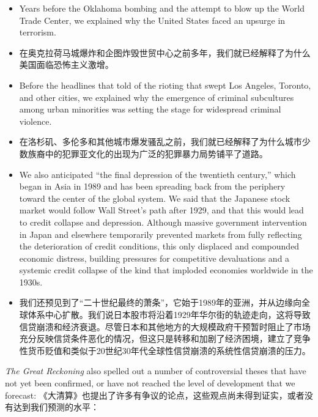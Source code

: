 \begin{itemize}
\item Years before the Oklahoma bombing and the attempt to blow up the World Trade Center, we explained why the United States faced an upsurge in terrorism. 
\item \small 在奥克拉荷马城爆炸和企图炸毁世贸中心之前多年，我们就已经解释了为什么美国面临恐怖主义激增。
\end{itemize}


\begin{itemize}
\item Before the headlines that told of the rioting that swept Los Angeles, Toronto, and other cities, we explained why the emergence of criminal subcultures among urban minorities was setting the stage for widespread criminal violence. 
\item \small 在洛杉矶、多伦多和其他城市爆发骚乱之前，我们就已经解释了为什么城市少数族裔中的犯罪亚文化的出现为广泛的犯罪暴力局势铺平了道路。
\end{itemize}


\begin{itemize}
\item We also anticipated “the final depression of the twentieth century,” which began in Asia in 1989 and has been spreading back from the periphery toward the center of the global system. We said that the Japanese stock market would follow Wall Street's path after 1929, and that this would lead to credit collapse and depression. Although massive government intervention in Japan and elsewhere temporarily prevented markets from fully reflecting the deterioration of credit conditions, this only displaced and compounded economic distress, building pressures for competitive devaluations and a systemic credit collapse of the kind that imploded economies worldwide in the 1930s. 
\item \small 我们还预见到了“二十世纪最终的萧条”，它始于1989年的亚洲，并从边缘向全球体系中心扩散。我们说日本股市将沿着1929年华尔街的轨迹走向，这将导致信贷崩溃和经济衰退。尽管日本和其他地方的大规模政府干预暂时阻止了市场充分反映信贷条件恶化的情况，但这只是转移和加剧了经济困境，建立了竞争性货币贬值和类似于20世纪30年代全球性信贷崩溃的系统性信贷崩溃的压力。
\end{itemize}


\begin{Parallel}{97mm}{45mm}


  \ParallelLText
  {\emph{The Great Reckoning} also spelled out a number of controversial theses that have not yet been confirmed, or have not reached the level of development that we forecast:   }  
  \ParallelRText
  {\small 《大清算》也提出了许多有争议的论点，这些观点尚未得到证实，或者没有达到我们预测的水平：}
  \ParallelPar

\end{Parallel}


